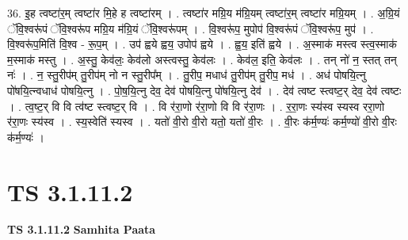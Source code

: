 \documentclass[17pt]{extarticle}
\begin{document}
36. इ॒ह त्वष्टा॑र॒म् त्वष्टा॑र मि॒हे ह त्वष्टा॑रम् । . त्वष्टा॑र मग्रि॒य म॑ग्रि॒यम् त्वष्टा॑र॒म् त्वष्टा॑र मग्रि॒यम् । . अ॒ग्रि॒यं ॅवि॒श्वरू॑पं ॅवि॒श्वरू॑प मग्रि॒य म॑ग्रि॒यं ॅवि॒श्वरू॑पम् । . वि॒श्वरू॑प॒ मुपोप॑ वि॒श्वरू॑पं ॅवि॒श्वरू॑प॒ मुप॑ । . वि॒श्वरू॑प॒मिति॑ वि॒श्व - रू॒प॒म् । . उप॑ ह्वये ह्वय॒ उपोप॑ ह्वये । . ह्व॒य॒ इति॑ ह्वये । . अ॒स्माक॑ मस्त्व स्त्व॒स्माक॑ म॒स्माक॑ मस्तु । . अ॒स्तु॒ केव॑लः॒ केव॑लो अस्त्वस्तु॒ केव॑लः । . केव॑ल॒ इति॒ केव॑लः । . तन् नो॑ न॒ स्तत् तन् नः॑ । . न॒ स्तु॒रीप॑म् तु॒रीप॑म् नो न स्तु॒रीप᳚म् । . तु॒रीप॒ मधाध॑ तु॒रीप॑म् तु॒रीप॒ मध॑ । . अध॑ पोषयि॒त्नु पो॑षयि॒त्न्वधाध॑ पोषयि॒त्नु । . पो॒ष॒यि॒त्नु देव॒ देव॑ पोषयि॒त्नु पो॑षयि॒त्नु देव॑ । . देव॑ त्वष्ट स्त्वष्ट॒र् देव॒ देव॑ त्वष्टः । . त्व॒ष्ट॒र् वि वि त्व॑ष्ट स्त्वष्ट॒र् वि । . वि र॑रा॒णो र॑रा॒णो वि वि र॑रा॒णः । . र॒रा॒णः स्य॑स्व स्यस्व ररा॒णो र॑रा॒णः स्य॑स्व । . स्य॒स्वेति॑ स्यस्व । . यतो॑ वी॒रो वी॒रो यतो॒ यतो॑ वी॒रः । . वी॒रः क॑र्म॒ण्यः॑ कर्म॒ण्यो॑ वी॒रो वी॒रः क॑र्म॒ण्यः॑ । \newline
\pagebreak
{}

\section{ TS 3.1.11.2 }

\textbf{TS 3.1.11.2 } \newline
\textbf{Samhita Paata} \newline
\end{document}
